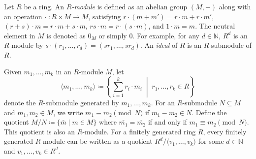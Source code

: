 \documentclass[letterpaper, 11pt, thm-restate]{article}
\numberwithin{equation}{section}
\newcommand{\N}{\mathbb{N}}
\newcommand{\gen}[1]{\langle {#1} \rangle}
\theoremstyle{definition}
\theoremstyle{definition}
\theoremstyle{definition}
\begin{document}
Let $R$ be a ring.
An \emph{$R$-module} is defined as an abelian group $(M, +)$ along with an operation $\cdot \;\colon R \times M \rightarrow M$, satisfying $r \cdot (m+m') = r \cdot m + r \cdot m'$, $(r + s) \cdot m = r \cdot m + s \cdot m$, $rs \cdot m = r\cdot (s \cdot m)$, and $1 \cdot m = m$.
The neutral element in $M$ is denoted as $0_M$ or simply $0$.
For example, for any $d \in \N$, $R^d$ is an $R$-module by $s \cdot (r_1, \ldots, r_d) = (sr_1, \ldots, sr_d)$.
An \emph{ideal} of $R$ is an $R$-submodule of $R$.

Given $m_1, \ldots, m_k$ in an $R$-module $M$, let 
\[
\textstyle
\gen{m_1, \ldots, m_k} \coloneqq \left\{\sum_{i=1}^k r_i \cdot m_i \;\middle|\; r_1, \ldots, r_k \in R\right\}
\]
denote the $R$-submodule generated by $m_1, \ldots, m_k$.
For an $R$-submodule $N \subseteq M$ and $m_1, m_2 \in M$, we write $m_1 \equiv m_2 \pmod N$ if $m_1 - m_2 \in N$.
Define the quotient $M/N \coloneqq \{\overline{m} \mid m \in M\}$ where $\overline{m_1} = \overline{m_2}$ if and only if $m_1 \equiv m_2 \pmod N$.
This quotient is also an $R$-module.
For a finitely generated ring $R$, every finitely generated $R$-module can be written as a quotient $R^d/\gen{v_1, \ldots, v_k}$ for some $d \in \N$ and $v_1, \ldots, v_k \in R^d$. 
\end{document}
